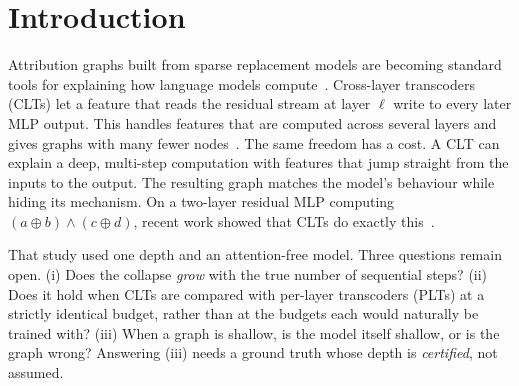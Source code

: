 \section{Introduction}
Attribution graphs built from sparse replacement models are becoming standard tools for explaining how language models compute~\cite{ameisen2025circuit,lindsey2025biology}. Cross-layer transcoders (CLTs) let a feature that reads the residual stream at layer $\ell$ write to every later MLP output. This handles features that are computed across several layers and gives graphs with many fewer nodes~\cite{ameisen2025circuit}. The same freedom has a cost. A CLT can explain a deep, multi-step computation with features that jump straight from the inputs to the output. The resulting graph matches the model's behaviour while hiding its mechanism. On a two-layer residual MLP computing $(a\oplus b)\wedge(c\oplus d)$, recent work showed that CLTs do exactly this~\cite{clt_unfaithful2026}.

That study used one depth and an attention-free model. Three questions remain open. (i) Does the collapse \emph{grow} with the true number of sequential steps? (ii) Does it hold when CLTs are compared with per-layer transcoders (PLTs) at a strictly identical budget, rather than at the budgets each would naturally be trained with? (iii) When a graph is shallow, is the model itself shallow, or is the graph wrong? Answering (iii) needs a ground truth whose depth is \emph{certified}, not assumed.

